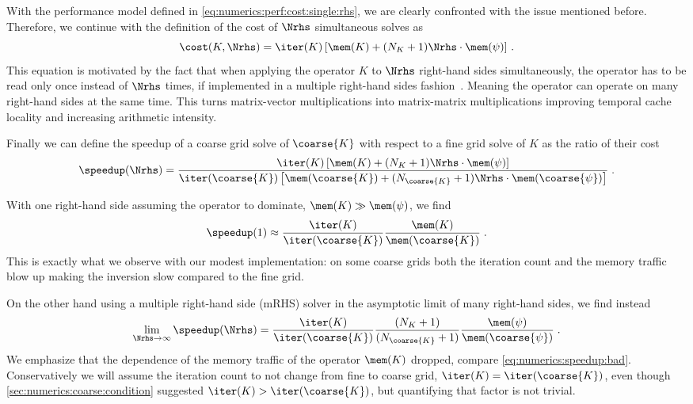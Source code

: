 With the performance model defined in \cref{eq:numerics:perf:cost:single:rhs}, we are clearly confronted with the issue mentioned before.
Therefore, we continue with the definition of the cost of $\Nrhs$ simultaneous solves as
\begin{equation}
\cost(K, \Nrhs) = \iter(K) \left[ \mem(K) + (N_{K} + 1) \Nrhs \cdot \mem(\psi) \right] \,.
\end{equation}
This equation is motivated by the fact that when applying the operator $K$ to $\Nrhs$ right-hand sides simultaneously, the operator has to be read only once instead of $\Nrhs$ times, if implemented in a multiple right-hand sides fashion~\cite{Boyle:2024pio}.
Meaning the operator can operate on many right-hand sides at the same time.
This turns matrix-vector multiplications into matrix-matrix multiplications improving temporal cache locality and increasing arithmetic intensity.

Finally we can define the speedup of a coarse grid solve of $\coarse{K}$ with respect to a fine grid solve of $K$ as the ratio of their cost
\begin{equation}
\speedup(\Nrhs)
= \frac{
   \iter(K) \left[ \mem(K) + (N_{K} + 1) \Nrhs \cdot \mem(\psi) \right]
}{
   \iter(\coarse{K}) \left[ \mem(\coarse{K}) + (N_{\coarse{K}} + 1) \Nrhs \cdot \mem(\coarse{\psi}) \right]
} \;.
\end{equation}

With one right-hand side assuming the operator to dominate, $\mem(K) \gg \mem(\psi)$, we find
\begin{equation} \label{eq:numerics:speedup:bad}
\speedup(1)
\approx \frac{ \iter(K) }{ \iter(\coarse{K}) }
  \frac{ \mem(K) }{ \mem(\coarse{K}) } \;.
\end{equation}
This is exactly what we observe with our modest implementation: on some coarse grids both the iteration count and the memory traffic blow up making the inversion slow compared to the fine grid.

On the other hand using a multiple right-hand side (mRHS) solver in the asymptotic limit of many right-hand sides, we find instead
\begin{equation}
\lim_{\Nrhs \to \infty} \speedup(\Nrhs)
= \frac{ \iter(K) }{ \iter(\coarse{K}) }
\frac{ (N_{K} + 1) }{ (N_{\coarse{K}} + 1) }
  \frac{ \mem(\psi) }{ \mem(\coarse{\psi}) } \;.
\end{equation}
We emphasize that the dependence of the memory traffic of the operator $\mem(K)$ dropped, compare \cref{eq:numerics:speedup:bad}.
Conservatively we will assume the iteration count to not change from fine to coarse grid, \ie $\iter(K) = \iter(\coarse{K})$, even though \cref{sec:numerics:coarse:condition} suggested $\iter(K) > \iter(\coarse{K})$, but quantifying that factor is not trivial.

